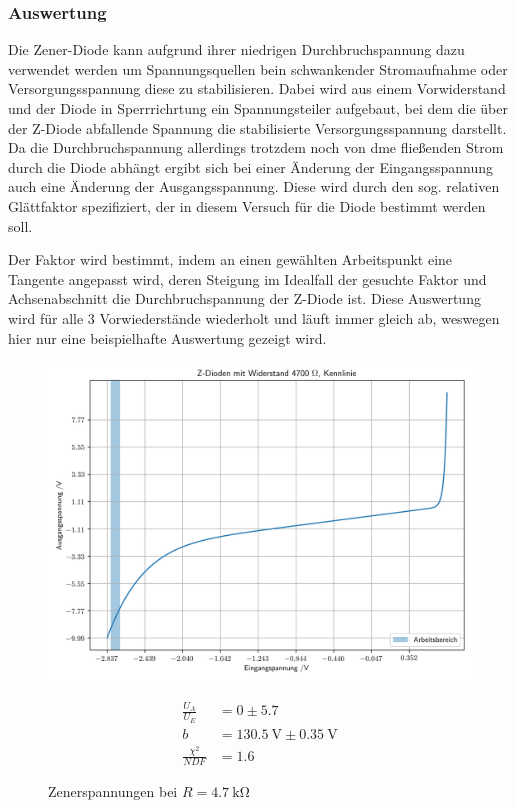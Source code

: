 \documentclass[12pt,twoside,a4paper]{scrartcl}
\begin{document}
			\subsubsection{Auswertung}
				Die Zener-Diode kann aufgrund ihrer niedrigen Durchbruchspannung dazu verwendet werden um Spannungsquellen bein schwankender Stromaufnahme oder Versorgungsspannung diese zu stabilisieren. Dabei wird aus einem Vorwiderstand und der Diode in Sperrrichrtung ein Spannungsteiler aufgebaut, bei dem die über der Z-Diode abfallende Spannung die stabilisierte Versorgungsspannung darstellt. Da die Durchbruchspannung allerdings trotzdem noch von dme fließenden Strom durch die Diode abhängt ergibt sich bei einer Änderung der Eingangsspannung auch eine Änderung der Ausgangsspannung. Diese wird durch den sog. relativen Glättfaktor spezifiziert, der in diesem Versuch für die Diode bestimmt werden soll.

				Der Faktor wird bestimmt, indem an einen gewählten Arbeitspunkt eine Tangente angepasst wird, deren Steigung im Idealfall der gesuchte Faktor und Achsenabschnitt die Durchbruchspannung der Z-Diode ist.
				Diese Auswertung wird für alle 3 Vorwiederstände wiederholt und läuft immer gleich ab, weswegen hier nur eine beispielhafte Auswertung gezeigt wird.

				\begin{figure}[H]
					\begin{minipage}{0.69 \textwidth}
						\includegraphics[width = \textwidth]{Plots/zener/spannungenZener_4700}
						\caption{Zenerspannungen bei $R = \SI{4.7}{\kilo \ohm} $}
					\end{minipage}
					\begin{minipage}{0.29 \textwidth}
						\begin{align*}
							\frac{U_A}{U_E} &= 0 \pm 5.7 \\
							b &= \SI{130.5}{ \volt } \pm \SI{0.35}{\volt} \\
							\frac{\chi^2}{NDF} &= 1.6
						\end{align*}
					\end{minipage}
				\end{figure}
\end{document}
